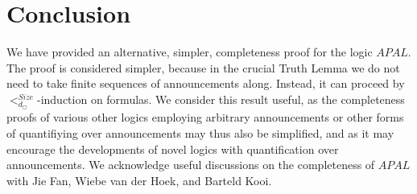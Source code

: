 \documentclass{article}[12pt]
\begin{document}
\section{Conclusion}
We have provided an alternative, simpler, completeness proof for the logic $APAL$. The proof is considered simpler, because in the crucial Truth Lemma we do not need to take finite sequences of announcements along. Instead, it can proceed by $<^{Size}_{d_{\Box}}$-induction on formulas.
We consider this result useful, as the completeness proofs of various other logics employing arbitrary announcements or other forms of quantifiying over announcements may thus also be simplified, and as it may encourage the developments of novel logics with quantification over announcements. We acknowledge useful discussions on the completeness of $APAL$ with Jie Fan, Wiebe van der Hoek, and Barteld Kooi.



\end{document}
